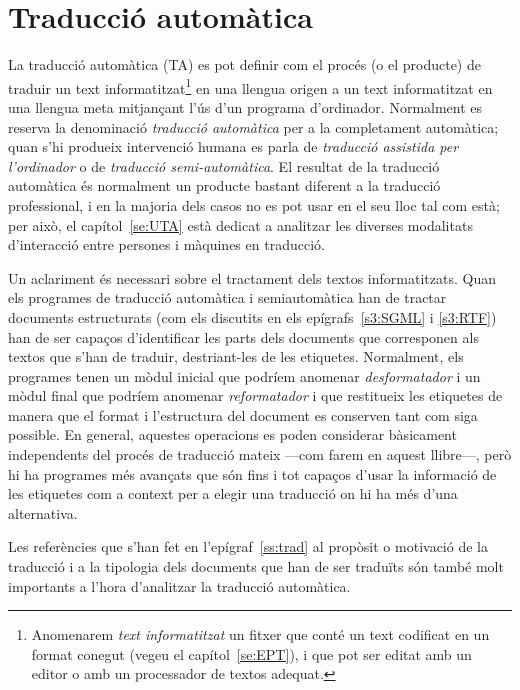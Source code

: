 \section{Traducció automàtica}
\label{ss:TA}


La traducció automàtica (TA) es pot definir com el procés (o el
producte) de traduir un text informatitzat\footnote{Anomenarem
  \emph{text informatitzat} un fitxer que conté un text codificat en
  un format conegut (vegeu el capítol~\ref{se:EPT}), i que pot ser
  editat amb un editor o amb un processador de textos adequat.} en una
llengua origen a un text informatitzat en una llengua meta mitjançant
l'ús d'un programa d'ordinador. Normalment es reserva la denominació
\emph{traducció automàtica} per a la completament automàtica; quan
s'hi produeix intervenció humana es parla de {\em traducció assistida
  per l'ordinador} o de \emph{traducció semi-automàtica}.  El resultat
de la traducció automàtica és normalment un producte bastant diferent
a la traducció professional, i en la majoria dels casos no es pot usar
en el seu lloc tal com està; per això, el capítol~\ref{se:UTA} està
dedicat a analitzar les diverses modalitats d'interacció entre
persones i màquines en traducció.

Un aclariment és necessari sobre el tractament dels textos
informatitzats. Quan els programes de traducció automàtica i
semiautomàtica han de tractar documents estructurats (com els
discutits en els epígrafs~\ref{s3:SGML} i \ref{s3:RTF}) han de ser
capaços d'identificar les parts dels documents que corresponen als
textos que s'han de traduir, destriant-les de les etiquetes.
Normalment, els programes tenen un mòdul inicial que podríem anomenar
\emph{desformatador} i un mòdul final que podríem anomenar
\emph{reformatador} i que restitueix les etiquetes de manera que el
format i l'estructura del document es conserven tant com siga
possible. En general, aquestes operacions es poden considerar
bàsicament independents del procés de traducció mateix ---com farem en
aquest llibre---, però hi ha programes més avançats que són fins i tot
capaços d'usar la informació de les etiquetes com a context per a
elegir una traducció on hi ha més d'una alternativa.

Les referències que s'han fet en l'epígraf~\ref{ss:trad} al propòsit o
motivació de la traducció i a la tipologia dels documents que han de
ser traduïts són també molt importants a l'hora d'analitzar la
traducció automàtica.



